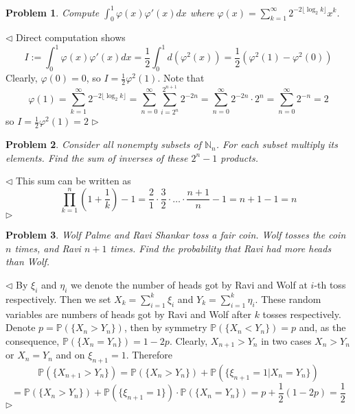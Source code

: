 \documentclass[12pt]{article}
\newtheorem{problem}{Problem}[subsection]
\newenvironment{solution}{\par $\triangleleft$}{$\triangleright$}
\begin{document}
\begin{problem} Compute $\int_0^1 \varphi(x)\varphi'(x)dx$ where
$\varphi(x)=\sum_{k=1}^\infty2^{-2\lfloor \log_2k\rfloor} x^k$.
\end{problem}
\begin{solution} Direct computation shows
    $$
        I:=\int_0^1 \varphi(x)\varphi'(x)dx
        =\frac{1}{2}\int_0^1 d(\varphi^2(x))
        =\frac{1}{2}(\varphi^2(1)-\varphi^2(0))
    $$
    Clearly, $\varphi(0)=0$, so $I=\frac{1}{2}\varphi^2(1)$. Note that
    $$
        \varphi(1)
        =\sum_{k=1}^\infty2^{-2\lfloor \log_2k\rfloor}
        =\sum_{n=0}^\infty\sum_{i=2^n}^{2^{n+1}} 2^{-2n}
        =\sum_{n=0}^\infty 2^{-2n}\cdot 2^n
        =\sum_{n=0}^\infty 2^{-n}
        =2
    $$
    so $I=\frac{1}{2}\varphi^2(1)=2$
\end{solution}

\begin{problem} Consider all nonempty subsets of $\mathbb{N}_n$. For each subset
multiply its elements. Find the sum of inverses of these $2^n-1$ products.
\end{problem}
\begin{solution} This sum can be written as
    $$
        \prod_{k=1}^n\left(1+\frac{1}{k}\right)-1
        =\frac{2}{1}\cdot\frac{3}{2}\cdot
        \ldots
        \cdot\frac{n+1}{n}-1=n+1-1=n
    $$
\end{solution}

\begin{problem} Wolf Palme and Ravi Shankar toss a fair coin. Wolf tosses the
coin $n$ times, and Ravi $n+1$ times. Find the probability that Ravi had more
heads than Wolf.
\end{problem}
\begin{solution} By $\xi_i$ and $\eta_i$ we denote the number of heads got by
    Ravi and Wolf at $i$-th toss respectively. Then we set 
    $X_k=\sum_{i=1}^k \xi_i$ and $Y_k=\sum_{i=1}^k \eta_i$. 
    These random variables are numbers of heads got by Ravi and Wolf after $k$ 
    tosses respectively. Denote
    $p=\mathbb{P}(\{X_n>Y_n\})$, then by symmetry $\mathbb{P}(\{X_n<Y_n\})=p$
    and, as the consequence, $\mathbb{P}(\{X_n=Y_n\})=1-2p$. Clearly,
    $X_{n+1}>Y_n$ in two cases $X_n>Y_n$ or $X_n=Y_n$ and on $\xi_{n+1}=1$.
    Therefore
    $$
        \mathbb{P}(\{X_{n+1}>Y_n\})
        =\mathbb{P}(\{X_n>Y_n\})+\mathbb{P}(\{\xi_{n+1}=1|X_n=Y_n\})
    $$
    $$
        =\mathbb{P}(\{X_n>Y_n\})+
        \mathbb{P}(\{\xi_{n+1}=1\})\cdot\mathbb{P}(\{X_n=Y_n\})
        =p+\frac{1}{2}(1-2p)=\frac{1}{2}
    $$
\end{solution}
\end{document}

